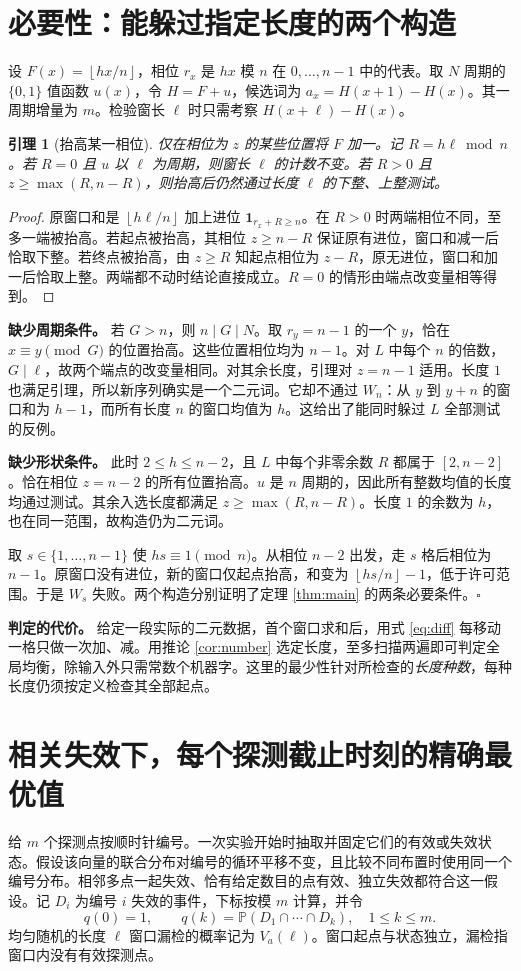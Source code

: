 \documentclass[UTF8,12pt,a4paper,fontset=fandol]{ctexart}
\theoremstyle{plaincn}
\newtheorem{lemma}[theorem]{引理}
\newcommand{\fl}[1]{\left\lfloor #1\right\rfloor}
\newcommand{\Prob}{\mathbb P}
\newcommand{\nextsec}[1]{\clearpage\section{#1}}
\begin{document}
\nextsec{必要性：能躲过指定长度的两个构造}
设 $F(x)=\fl{hx/n}$，相位 $r_x$ 是 $hx$ 模 $n$ 在 $0,\ldots,n-1$ 中的代表。取 $N$ 周期的 $\{0,1\}$ 值函数 $u(x)$，令 $H=F+u$，候选词为 $a_x=H(x+1)-H(x)$。其一周期增量为 $m$。检验窗长 $\ell$ 时只需考察 $H(x+\ell)-H(x)$。

\begin{lemma}[抬高某一相位]\label{lem:raise}
仅在相位为 $z$ 的某些位置将 $F$ 加一。记 $R=h\ell\bmod n$。若 $R=0$ 且 $u$ 以 $\ell$ 为周期，则窗长 $\ell$ 的计数不变。若 $R>0$ 且 $z\ge\max(R,n-R)$，则抬高后仍然通过长度 $\ell$ 的下整、上整测试。
\end{lemma}
\begin{proof}
原窗口和是 $\fl{h\ell/n}$ 加上进位 $\boldsymbol{1}_{r_x+R\ge n}$。在 $R>0$ 时两端相位不同，至多一端被抬高。若起点被抬高，其相位 $z\ge n-R$ 保证原有进位，窗口和减一后恰取下整。若终点被抬高，由 $z\ge R$ 知起点相位为 $z-R$，原无进位，窗口和加一后恰取上整。两端都不动时结论直接成立。$R=0$ 的情形由端点改变量相等得到。
\end{proof}

\noindent\textbf{缺少周期条件。}
若 $G>n$，则 $n\mid G\mid N$。取 $r_y=n-1$ 的一个 $y$，恰在 $x\equiv y\pmod G$ 的位置抬高。这些位置相位均为 $n-1$。对 $L$ 中每个 $n$ 的倍数，$G\mid\ell$，故两个端点的改变量相同。对其余长度，引理对 $z=n-1$ 适用。长度 $1$ 也满足引理，所以新序列确实是一个二元词。它却不通过 $W_n$：从 $y$ 到 $y+n$ 的窗口和为 $h-1$，而所有长度 $n$ 的窗口均值为 $h$。这给出了能同时躲过 $L$ 全部测试的反例。

\noindent\textbf{缺少形状条件。}
此时 $2\le h\le n-2$，且 $L$ 中每个非零余数 $R$ 都属于 $[2,n-2]$。恰在相位 $z=n-2$ 的所有位置抬高。$u$ 是 $n$ 周期的，因此所有整数均值的长度均通过测试。其余入选长度都满足 $z\ge\max(R,n-R)$。长度 $1$ 的余数为 $h$，也在同一范围，故构造仍为二元词。

取 $s\in\{1,\ldots,n-1\}$ 使 $hs\equiv1\pmod n$。从相位 $n-2$ 出发，走 $s$ 格后相位为 $n-1$。原窗口没有进位，新的窗口仅起点抬高，和变为 $\fl{hs/n}-1$，低于许可范围。于是 $W_s$ 失败。两个构造分别证明了定理 \ref{thm:main} 的两条必要条件。\hfill$\square$

\medskip
\noindent\textbf{判定的代价。}
给定一段实际的二元数据，首个窗口求和后，用式 \eqref{eq:diff} 每移动一格只做一次加、减。用推论 \ref{cor:number} 选定长度，至多扫描两遍即可判定全局均衡，除输入外只需常数个机器字。这里的最少性针对所检查的\emph{长度种数}，每种长度仍须按定义检查其全部起点。

\nextsec{相关失效下，每个探测截止时刻的精确最优值}
给 $m$ 个探测点按顺时针编号。一次实验开始时抽取并固定它们的有效或失效状态。假设该向量的联合分布对编号的循环平移不变，且比较不同布置时使用同一个编号分布。相邻多点一起失效、恰有给定数目的点有效、独立失效都符合这一假设。记 $D_i$ 为编号 $i$ 失效的事件，下标按模 $m$ 计算，并令
\[
 q(0)=1,\qquad q(k)=\Prob(D_1\cap\cdots\cap D_k),\quad 1\le k\le m .
\]
均匀随机的长度 $\ell$ 窗口漏检的概率记为 $V_a(\ell)$。窗口起点与状态独立，漏检指窗口内没有有效探测点。
\end{document}

